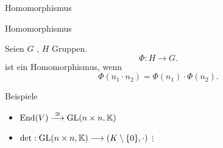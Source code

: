 \documentclass[class=article, crop=false]{standalone}
\begin{document}
\begin{zettel}{Homomorphismus}
\begin{flashcard}[60v885z7]{Homomorphismus}
	\begin{definition}[Homomorphismus]

		Seien $G$ , $H$ Gruppen.
		\[
			\Phi: H \longrightarrow G
		.\]
		ist ein Homomorphismus, wenn
		\[
			\Phi (n_1 \cdot n_2 ) = \Phi (n_1) \cdot \Phi (n_2)
		.\]

	\end{definition}
\end{flashcard}

\begin{example}[Homomorphismen]
	Beispiele
	\begin{itemize}
		\item $\operatorname{End}(V) \stackrel{\cong}{\longrightarrow}  \operatorname{GL}(n \times n,\mathbb{K}) $
		\item $ \det: \GL(n \times n,\K) \longrightarrow (K \setminus \set{0},\cdot )$
		      $\vdots$
	\end{itemize}

\end{example}
\end{zettel}
\end{document}
